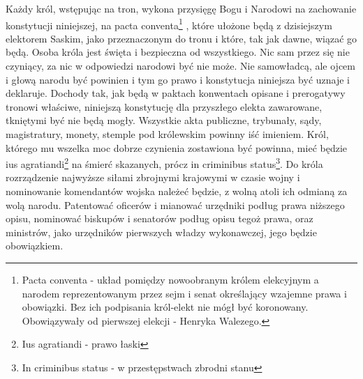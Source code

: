 \documentclass{book}
\begin{document}
 Każdy król, wstępując na tron, wykona przysięgę Bogu i Narodowi na zachowanie konstytucji niniejszej, na pacta conventa\footnote{Pacta conventa - układ pomiędzy nowoobranym królem elekcyjnym a narodem reprezentowanym przez sejm i senat określający wzajemne prawa i obowiązki.  Bez ich podpisania król-elekt nie mógł być koronowany.  Obowiązywały od pierwszej elekcji - Henryka Walezego. } , które ułożone będą z dzisiejszym elektorem Saskim, jako przeznaczonym do tronu i które, tak jak dawne, wiązać go będą.  Osoba króla jest święta i bezpieczna od wszystkiego.  Nic sam przez się nie czyniący, za nic w odpowiedzi narodowi być nie może.  Nie samowładcą, ale ojcem i głową narodu być powinien i tym go prawo i konstytucja niniejsza być uznaje i deklaruje.  Dochody tak, jak będą w paktach konwentach opisane i prerogatywy tronowi właściwe, niniejszą konstytucję dla przyszłego elekta zawarowane, tkniętymi być nie będą mogły.  Wszystkie akta publiczne, trybunały, sądy, magistratury, monety, stemple pod królewskim powinny iść imieniem.  Król, którego mu wszelka moc dobrze czynienia zostawiona być powinna, mieć będzie ius agratiandi\footnote{Ius agratiandi - prawo łaski} na śmierć skazanych, prócz in criminibus status\footnote{In criminibus status - w przestępstwach zbrodni stanu}.  Do króla rozrządzenie najwyższe siłami zbrojnymi krajowymi w czasie wojny i nominowanie komendantów wojska należeć będzie, z wolną atoli ich odmianą za wolą narodu.  Patentować oficerów i mianować urzędniki podług prawa niższego opisu, nominować biskupów i senatorów podług opisu tegoż prawa,  oraz ministrów, jako urzędników pierwszych władzy wykonawczej, jego będzie obowiązkiem.  
\end{document}

